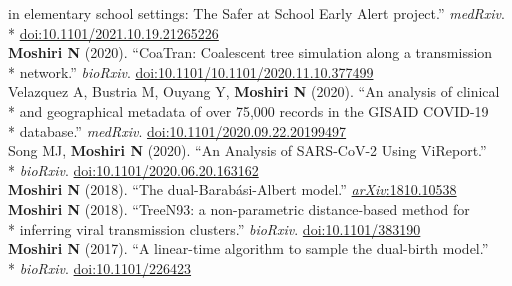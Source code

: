 \documentclass[margin,line]{res}
\begin{document}
\begin{resume}
\hspace*{9mm} in elementary school settings: The Safer at School Early Alert project.'' \textit{medRxiv}.\\*\vspace{2mm}
\hspace*{8mm} \href{https://doi.org/10.1101/2021.10.19.21265226}{doi:10.1101/2021.10.19.21265226}\\
\hspace*{4mm} \textbf{Moshiri N} (2020). ``CoaTran: Coalescent tree simulation along a transmission\\*\vspace{2mm}
\hspace*{8mm} network.'' \textit{bioRxiv}. \href{https://doi.org/10.1101/10.1101/2020.11.10.377499}{doi:10.1101/10.1101/2020.11.10.377499}\\
\hspace*{4mm} Velazquez A, Bustria M, Ouyang Y, \textbf{Moshiri N} (2020). ``An analysis of clinical\\*
\hspace*{9mm} and geographical metadata of over 75,000 records in the GISAID COVID-19\\*\vspace{2mm}
\hspace*{8mm} database.'' \textit{medRxiv}. \href{https://doi.org/10.1101/2020.09.22.20199497}{doi:10.1101/2020.09.22.20199497}\\
\hspace*{4mm} Song MJ, \textbf{Moshiri N} (2020). ``An Analysis of SARS-CoV-2 Using ViReport.''\\*\vspace{2mm}
\hspace*{8mm} \textit{bioRxiv}. \href{https://doi.org/10.1101/2020.06.20.163162}{doi:10.1101/2020.06.20.163162}\\
\hspace*{4mm} \vspace{2mm}\textbf{Moshiri N} (2018). ``The dual-Barab\'asi-Albert model.'' \href{https://arxiv.org/abs/1810.10538}{\textit{arXiv}:1810.10538}\\
\hspace*{4mm} \textbf{Moshiri N} (2018). ``TreeN93: a non-parametric distance-based method for\\*\vspace{2mm}
\hspace*{8mm} inferring viral transmission clusters.'' \textit{bioRxiv}. \href{https://doi.org/10.1101/383190}{doi:10.1101/383190}\\
\hspace*{4mm} \textbf{Moshiri N} (2017). ``A linear-time algorithm to sample the dual-birth model.''\\*\vspace{2mm}
\hspace*{8mm} \textit{bioRxiv}. \href{https://doi.org/10.1101/226423}{doi:10.1101/226423}\\


\end{resume}
\end{document}
